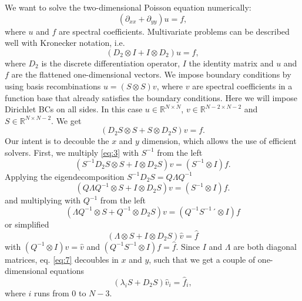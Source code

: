 \documentclass[10pt,a4paper]{article}
\begin{document}
We want to solve the two-dimensional Poisson equation numerically:
\begin{equation}
(\partial_{xx} + \partial_{yy}) u = f,
\end{equation}
where $u$ and $f$ are spectral coefficients. 
Multivariate problems can be described well with Kronecker notation, i.e.
\begin{equation}
(D_2 \otimes I + I \otimes D_2) u = f,
\end{equation}
where $D_2$ is the discrete differentiation operator, $I$ the identity matrix and $u$ and $f$ are the flattened one-dimensional vectors.
We impose boundary conditions by using basis recombinations $u=(S\otimes S)v$, where $v$ are spectral coefficients in a function base that already satisfies the boundary conditions. Here we will impose Dirichlet BCs on all sides. In this case $u\in\mathbb{R}^{N\times N}$, $v\in\mathbb{R}^{N-2\times N-2}$ and $S\in\mathbb{R}^{N\times N-2}$. We get
\begin{equation}
(D_2 S \otimes S + S \otimes D_2 S) v = f.
\label{eq:3}
\end{equation}
Our intent is to decouble the $x$ and $y$ dimension, which allows the use of efficient solvers. First, we multiply \eqref{eq:3} with $S^{-1}$ from the left
\begin{equation}
(S^{-1} D_2 S \otimes S + I \otimes D_2 S) v = (S^{-1}  \otimes I)f.
\label{eq:4}
\end{equation}
Applying the eigendecomposition $S^{-1} D_2 S = Q \Lambda Q^{-1}$
\begin{equation}
(Q \Lambda Q^{-1} \otimes S +  I \otimes D_2 S) v = (S^{-1}  \otimes I)f.
\label{eq:5}
\end{equation}
and multiplying with $Q^{-1}$ from the left
\begin{equation}
(\Lambda Q^{-1} \otimes S +  Q^{-1} \otimes D_2 S) v = (Q^{-1} S^{-1}´  \otimes I)f
\label{eq:6}
\end{equation}
or simplified
\begin{equation}
(\Lambda \otimes S +   I \otimes D_2 S) \widehat{v} = \widehat{f}
\label{eq:7}
\end{equation}
with $(Q^{-1} \otimes I) v = \widehat{v}$ and $(Q^{-1} S^{-1}  \otimes I)f = \widehat{f}$. Since $I$ and $\Lambda$ are both diagonal matrices, eq. \eqref{eq:7} decoubles in $x$ and $y$, such that we get a couple of one-dimensional equations
\begin{equation}
(\lambda_i S + D_2 S) \widehat{v}_i = \widehat{f}_i,
\label{eq:8}
\end{equation}
where $i$ runs from $0$ to $N-3$.\\
\end{document}
